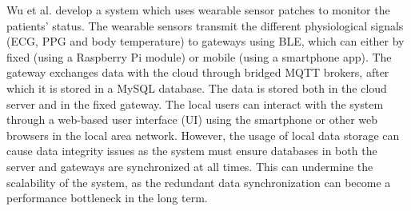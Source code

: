 %
%


Wu et al. \cite{Wu2020} develop a system which uses wearable sensor patches to monitor the patients' status. The wearable sensors transmit the different physiological signals (ECG, PPG and body temperature) to gateways using \acs{BLE}, which can either by fixed (using a Raspberry Pi module) or mobile (using a smartphone app). The gateway exchanges data with the cloud through bridged \acs{MQTT} brokers, after which it is stored in a MySQL database. The data is stored both in the cloud server and in the fixed gateway. The local users can interact with the system through a web-based user interface (UI) using the smartphone or other web browsers in the local area network. However, the usage of local data storage can cause data integrity issues as the system must ensure databases in both the server and gateways are synchronized at all times. This can undermine the scalability of the system, as the redundant data synchronization can become a performance bottleneck in the long term. \bigskip

%
%

